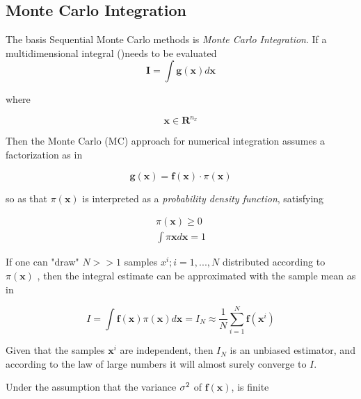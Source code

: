 \subsection{Monte Carlo Integration}
The basis Sequential Monte Carlo methods is \emph{Monte Carlo Integration}. If a multidimensional integral ()needs to be evaluated 
\begin{equation}
\label{eq:MCI}
\mathbf{I} = \int \mathbf{g(x)} d\mathbf{x}
\end{equation}

where 

\begin{equation}
	 \mathbf{x} \in \mathbf{R}^{n_{x}} 
\end{equation}


Then the Monte Carlo (MC) approach for numerical integration assumes a factorization as in 

\begin{equation}
\label{eq:MCIfact}\mathbf{g(x)} = \mathbf{f(x)} \cdot \pi(\mathbf{x}) 
\end{equation}


so  as that $\pi(\mathbf{x})$ is interpreted as a \emph{probability density function}, satisfying 

\begin{equation}\label{eq:MCI2}
\begin{aligned}
\pi(\mathbf{x}) \geq 0 \\
\int \pi \mathbf{x} d \mathbf{x} = 1
\end{aligned}
\end{equation}




If one can "draw" $N >> 1$ samples ${x^i; i = 1,...,N}$ distributed according to $\pi (\mathbf{x})$ , then the integral estimate can be approximated with the sample mean as in  

\begin{equation}\label{eq:MCI3}
I = \int \mathbf{f}(\mathbf{x})\pi(\mathbf{x}) d\mathbf{x} = I_N \approx \frac{1}{N}\sum_{i=1}^{N} \mathbf{f}(\mathbf{x}^i)
\end{equation}


Given that the samples $\mathbf{x}^i$ are independent, then $I_N$ is an unbiased estimator, and according to the law of large numbers it will almost surely converge to $I$.


Under the assumption that the variance ${\sigma^2}$ of $\mathbf{f}(\mathbf{x})$,  is finite

